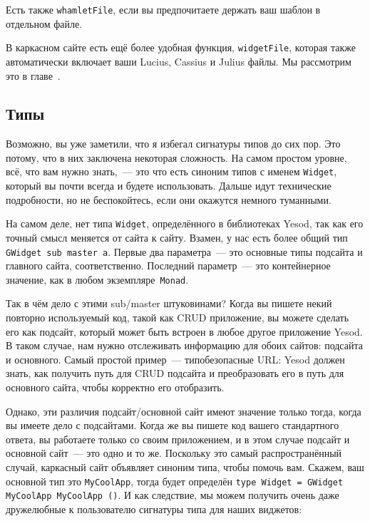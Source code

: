 Есть также \lstinline'whamletFile', если вы предпочитаете держать ваш шаблон в отдельном файле.

\begin{remark}
В каркасном сайте есть ещё более удобная функция, \lstinline'widgetFile', которая также автоматически включает ваши Lucius, Cassius и Julius файлы. Мы рассмотрим это в главе~.
\end{remark}

\subsection{Типы}

Возможно, вы уже заметили, что я избегал сигнатуры типов до сих пор. Это потому, что в них заключена некоторая сложность. На самом простом уровне, всё, что вам нужно знать,~--- это что есть синоним типов с именем \lstinline'Widget', который вы почти всегда и будете использовать. Дальше идут технические подробности, но не беспокойтесь, если они окажутся немного туманными.

На самом деле, нет типа \lstinline'Widget', определённого в библиотеках Yesod, так как его точный смысл меняется от сайта к сайту. Взамен, у нас есть более общий тип \lstinline'GWidget sub master a'. Первые два параметра~--- это основные типы подсайта и главного сайта, соответственно. Последний параметр~--- это контейнерное значение, как в любом экземпляре~\lstinline'Monad'.

Так в чём дело с этими sub/master штуковинами? Когда вы пишете некий повторно используемый код, такой как CRUD приложение, вы можете сделать его как подсайт, который может быть встроен в любое другое приложение Yesod. В таком случае, нам нужно отслеживать информацию для обоих сайтов: подсайта и основного. Самый простой пример~--- типобезопасные URL: Yesod должен знать, как получить путь для CRUD подсайта и преобразовать его в путь для основного сайта, чтобы корректно его отобразить.

Однако, эти различия подсайт/основной сайт имеют значение только тогда, когда вы имеете дело с подсайтами. Когда же вы пишете код вашего стандартного ответа, вы работаете только со своим приложением, и в этом случае подсайт и основной сайт~--- это одно и то же. Поскольку это самый распространённый случай, каркасный сайт объявляет синоним типа, чтобы помочь вам. Скажем, ваш основной тип это \lstinline'MyCoolApp', тогда будет определён \lstinline'type Widget = GWidget MyCoolApp MyCoolApp ()'. И как следствие, мы можем получить очень даже дружелюбные к пользователю сигнатуры типа для наших виджетов:

